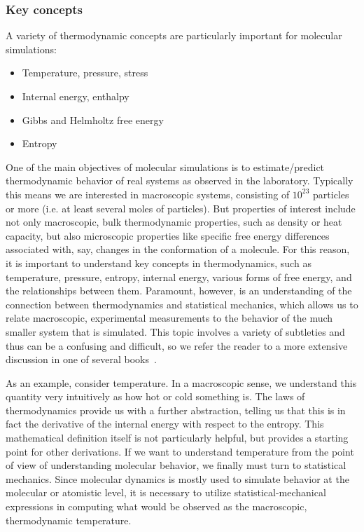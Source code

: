 \documentclass[9pt,bestpractices]{livecoms}
\begin{document}
\subsubsection{Key concepts}
A variety of thermodynamic concepts are particularly important for molecular simulations:
\begin{itemize}
\item Temperature, pressure, stress
\item Internal energy, enthalpy
\item Gibbs and Helmholtz free energy
\item Entropy
\end{itemize}

One of the main objectives of molecular simulations is to estimate/predict thermodynamic behavior of real systems as observed in the laboratory.
Typically this means we are interested in macroscopic systems, consisting of $10^{23}$ particles or more (i.e. at least several moles of particles). 
But properties of interest include not only macroscopic, bulk thermodynamic properties, such as density or heat capacity,
but also microscopic properties like specific free energy differences associated with, say, changes in the conformation of a molecule.
For this reason, it is important to understand key concepts in thermodynamics, such as temperature, pressure, entropy, internal energy, various forms of free energy, and the relationships between them.
Paramount, however, is an understanding of the connection between thermodynamics and statistical mechanics, which allows us to relate macroscopic, experimental measurements to the behavior of the much smaller system that is simulated.
This topic involves a variety of subtleties and thus can be a confusing and difficult, so we refer the reader to a more extensive discussion in one of several books~\cite{ShellBook, DillBook}.

As an example, consider temperature.
In a macroscopic sense, we understand this quantity very intuitively as how hot or cold something is.
The laws of thermodynamics provide us with a further abstraction, telling us that this is in fact the derivative of the internal energy with respect to the entropy.
This mathematical definition itself is not particularly helpful, but provides a starting point for other derivations.
If we want to understand temperature from the point of view of understanding molecular behavior, we finally must turn to statistical mechanics.
Since molecular dynamics is mostly used to simulate behavior at the molecular or atomistic level, it is necessary to utilize statistical-mechanical expressions in computing what would be observed as the macroscopic, thermodynamic temperature.
\end{document}
